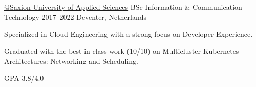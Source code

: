 
\begin{cventries}

  \cventry
    {\href{https://www.saxion.edu}{@Saxion University of Applied Sciences}}
    {BSc Information \& Communication Technology}
    {2017--2022}
    {Deventer, Netherlands}
    {
      \begin{cvitems}
        \item {Specialized in Cloud Engineering with a strong focus on Developer Experience.}
        \item {Graduated with the best-in-class work (10/10) on Multicluster Kubernetes Architectures: Networking and Scheduling.}
        \item {GPA 3.8/4.0}
      \end{cvitems}
    }

\end{cventries}
